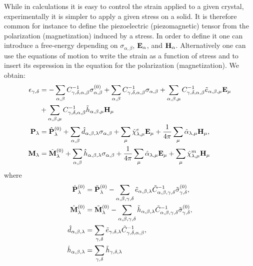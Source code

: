 \documentclass[12pt,a4paper,twoside]{report}
\begin{document}
\newpage
{\color{orange}
While in calculations it is easy to control the strain applied to
a given crystal, experimentally it is simpler to apply a given stress
on a solid. It is therefore common for instance to define the 
piezoelectric (piezomagnetic) tensor from the polarization 
(magnetization) induced by a stress. In order to define it one 
can introduce a free-energy depending on $\sigma_{\alpha,\beta}$,
${\bf E}_\alpha$, and ${\bf H}_\alpha$. Alternatively one can use the
equations of motion to write the strain as a function of stress and
to insert its espression in the equation for the polarization
(magnetization). We obtain:
\begin{align}
\epsilon_{\gamma,\delta} &=
- \sum_{\alpha,\beta} 
C^{-1}_{\gamma,\delta,\alpha,\beta} \sigma^{(0)}_{\alpha,\beta} 
+ \sum_{\alpha,\beta} 
C^{-1}_{\gamma,\delta,\alpha,\beta} \sigma_{\alpha,\beta} 
+ \sum_{\alpha,\beta,\mu} 
C^{-1}_{\gamma,\delta,\alpha,\beta} \tilde e_{\alpha,\beta,\mu} {\bf E}_\mu 
\nonumber \\
&+ \sum_{\alpha,\beta,\mu} 
C^{-1}_{\gamma,\delta,\alpha,\beta} \tilde h_{\alpha,\beta,\mu} {\bf H}_\mu 
\\
{\bf P}_{\lambda}&= \hat {\bf P}^{(0)}_{\lambda}
+\sum_{\alpha,\beta} \hat d_{\alpha,\beta,\lambda} 
\sigma_{\alpha,\beta} +
\sum_{\mu} 
\hat \chi^e_{\lambda,\mu}
{\bf E}_{\mu} +
{1\over 4 \pi}\sum_{\mu} \hat \alpha_{\lambda,\mu} 
{\bf H}_{\mu}, \\
{\bf M}_{\lambda}&= \hat {\bf M}^{(0)}_{\lambda}
+\sum_{\alpha,\beta} \hat h_{\alpha,\beta,\lambda} 
\sigma_{\alpha,\beta} +
{1\over 4 \pi} \sum_{\mu} \hat \alpha_{\lambda,\mu} 
{\bf E}_{\mu}+
\sum_{\mu} 
\hat \chi^m_{\lambda,\mu}
{\bf H}_{\mu}
\end{align} 
where
\begin{align}
\hat {\bf P}^{(0)}_{\lambda}&= \tilde {\bf P}^{(0)}_{\lambda}
-\sum_{\alpha,\beta,\gamma,\delta} \tilde e_{\alpha,\beta,\lambda}
\tilde C^{-1}_{\alpha,\beta,\gamma,\delta} 
\tilde \sigma^{(0)}_{\gamma,\delta}, \\
\hat {\bf M}^{(0)}_{\lambda}&= \tilde {\bf M}^{(0)}_{\lambda}
-\sum_{\alpha,\beta,\gamma,\delta} \tilde h_{\alpha,\beta,\lambda}
\tilde C^{-1}_{\alpha,\beta,\gamma,\delta} 
\tilde \sigma^{(0)}_{\gamma,\delta}, \\
\hat d_{\alpha,\beta,\lambda}&= \sum_{\gamma,\delta} 
\tilde e_{\gamma,\delta,\lambda} 
\tilde C^{-1}_{\gamma,\delta,\alpha,\beta}, \\
\hat h_{\alpha,\beta,\lambda}&= \sum_{\gamma,\delta} 
\tilde h_{\gamma,\delta,\lambda} 

\end{align}}
\end{document}

